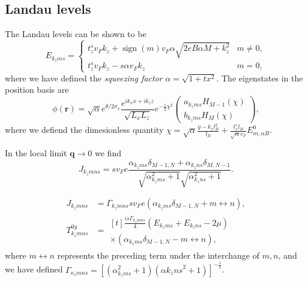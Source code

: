 \documentclass[%
 reprint,
 amsmath,amssymb,
 aps,
]{revtex4-2}
\renewcommand\vec\bm  %
\DeclareMathOperator\sign{sign}
\begin{document}
\subsection{Landau levels}
The Landau levels can be shown to be
\begin{equation}
  \label{eq:eigenlevels}
  E_{k_z m s} =
  \begin{cases}
    t_z^s v_F k_z + \sign(m) v_F \alpha \sqrt{2 e B \alpha M + k_z^2} & m \neq 0,\\
    t_z^s v_F k_z - s \alpha v_F k_z & m = 0,
  \end{cases}
\end{equation}
where we have defined the \emph{squeezing factor} \( \alpha = \sqrt{1 + tx^2} \).
The eigenstates in the position basis are
\begin{equation}
  \label{eq:eigenstates}
  \phi(\vec{r}) = \sqrt{\alpha} e^{\theta / 2 \sigma_x} \frac{e^{i k_x x + ik_z z }}{\sqrt{L_{x} L_{z}}} e^{- \frac{1}{2} \chi^2}
  \begin{pmatrix}
    a_{k_z m s} H_{M-1} (\chi)\\
    b_{k_z m s} H_M (\chi)
  \end{pmatrix},
\end{equation}
where we defiend the dimesionless quantity \( \chi = \sqrt{\alpha} \frac{y-k_{x}l_B^2}{l_{B}} + \frac{t_x^s l_B}{\sqrt{\alpha} v_{F}} E^0_{m, \alpha B} \).

In the local limit \( \vec{q} \to 0 \) we find
\begin{equation}
  \label{eq:3}
  J_{k_z m n s} = s v_F e \frac{\alpha_{k_z m s} \delta_{M-1, N} + \alpha_{k_z n s} \delta_{M, N-1}}{
    \sqrt{\alpha_{k_{z} m s}^2 + 1}
    \sqrt{\alpha_{k_{z} n s}^2 + 1}
  }.
\end{equation}

\begin{align}
  \label{eq:1}
  J_{k_z m n s} &= \Gamma_{k_z m n s} s v_F e ( \alpha_{k_z m s } \delta_{M-1, N} + m \leftrightarrow n),\\
  T_{k_z m n s}^{0y} &=
                       \begin{multlined}[t]
                         \frac{i s \Gamma_{k_z m n s}}{4} (E_{k_z m s} + E_{k_z n s} - 2 \mu )\\
                         \times (\alpha_{k_z m s} \delta_{M-1, N} - m \leftrightarrow n),
                       \end{multlined}
\end{align}
where \( m \leftrightarrow n  \) represents the preceding term under the interchange of \( m,n \), and we have defined \( \Gamma_{\kappa_z m n s} = \left[(\alpha_{k_z m s}^2 + 1) (\alpha{k_z n s}^2 + 1)\right]^{-\frac{1}{2}} \).
\end{document}
